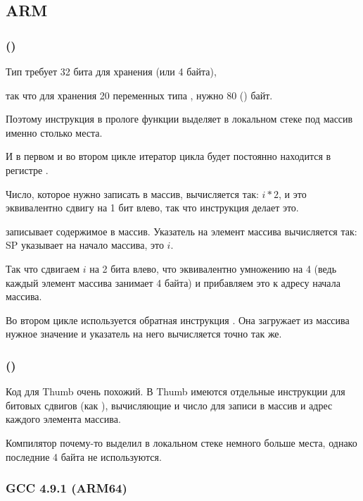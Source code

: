 \subsection{ARM}

\subsubsection{\NonOptimizingKeilVI (\ARMMode)}



Тип \Tint требует 32 бита для хранения (или 4 байта),

так что для хранения 20 переменных типа \Tint, нужно 80 () байт.

Поэтому инструкция  
в прологе функции выделяет в локальном стеке под массив именно столько места.

И в первом и во втором цикле итератор цикла  будет постоянно находится в регистре .

Число, которое нужно записать в массив, вычисляется так: $i*2$, и это эквивалентно 
сдвигу на 1 бит влево, так что инструкция  делает это.

 записывает содержимое  в массив.
Указатель на элемент массива вычисляется так: \ac{SP} указывает на начало массива,  это $i$.

Так что сдвигаем $i$ на 2 бита влево, что эквивалентно умножению на 4 
(ведь каждый элемент массива занимает 4 байта) и прибавляем это к адресу начала массива.

Во втором цикле используется обратная инструкция .
Она загружает из массива нужное значение и указатель на него вычисляется точно так же.

\subsubsection{\OptimizingKeilVI (\ThumbMode)}



Код для Thumb очень похожий.
В Thumb имеются отдельные инструкции для битовых сдвигов (как ), 
вычисляющие и число для записи в массив и адрес каждого элемента массива.

Компилятор почему-то выделил в локальном стеке немного больше места, 
однако последние 4 байта не используются.

\subsubsection{\NonOptimizing GCC 4.9.1 (ARM64)}



